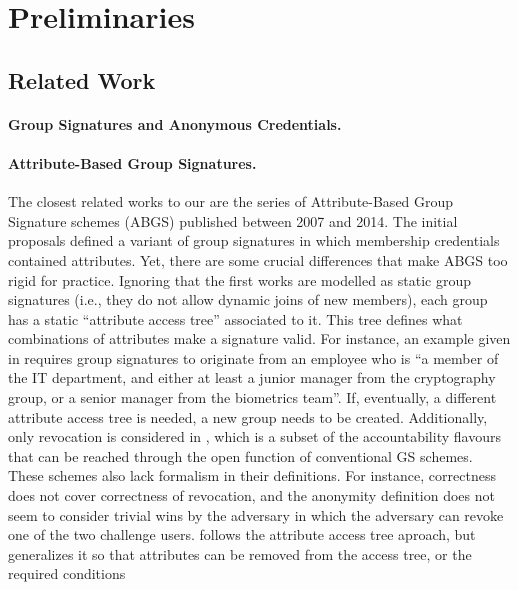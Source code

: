 \section{Preliminaries}
\label{sec:preliminaries}

\subsection{Related Work}
\label{ssec:related}

\paragraph{Group Signatures and Anonymous Credentials.} %

\paragraph{Attribute-Based Group Signatures.} %
The closest related works to our \GSAC are the series of Attribute-Based Group
Signature schemes (ABGS) published between 2007 and 2014. The initial proposals
\cite{khad07a,khad07b} defined a variant of group signatures in which membership
credentials contained attributes. Yet, there are some
crucial differences that make ABGS too rigid for practice. Ignoring that the
first works \cite{khad07a,khad07b} are modelled as static group signatures
(i.e., they do not allow dynamic joins of new members), each group has a static
``attribute access tree'' associated to it. This tree defines what combinations
of attributes make a signature valid. For instance, an example given in
\cite{khad07b} requires group signatures to originate from an employee who is
``a member of the IT department, and either at least a junior manager from the
cryptography group, or a senior manager from the biometrics team''. If,
eventually, a different attribute access tree is needed, a new group needs to
be created. Additionally, only revocation is considered in \cite{khad07b},
which is a subset of the accountability flavours that can be reached through
the open function of conventional GS schemes. These schemes also lack formalism
in their definitions. For instance, correctness does not cover correctness of
revocation, and the anonymity definition does not seem to consider trivial wins
by the adversary in which the adversary can revoke one of the two challenge
users.
%
\cite{emo09} follows the attribute access tree aproach, but generalizes it so
that attributes can be removed from the access tree, or the required conditions
